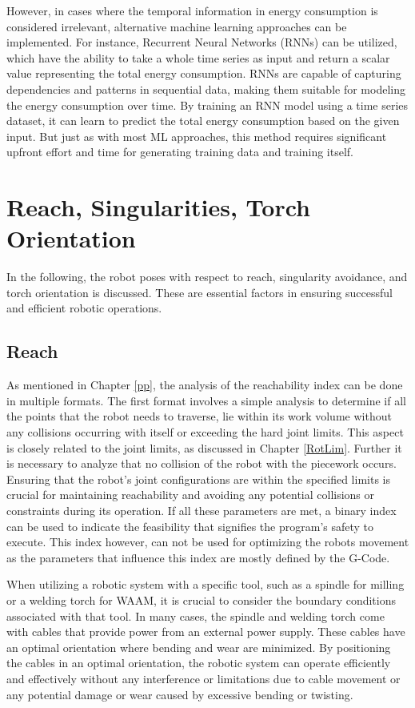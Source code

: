 However, in cases where the temporal information in energy consumption is considered irrelevant, alternative machine learning approaches can be implemented. For instance, Recurrent Neural Networks (RNNs) can be utilized, which have the ability to take a whole time series as input and return a scalar value representing the total energy consumption. RNNs are capable of capturing dependencies and patterns in sequential data, making them suitable for modeling the energy consumption over time. By training an RNN model using a time series dataset, it can learn to predict the total energy consumption based on the given input. But just as with most ML approaches, this method requires significant upfront effort and time for generating training data and training itself.


\section{Reach, Singularities, Torch Orientation}
In the following, the robot poses with respect to reach, singularity avoidance, and torch orientation is discussed. These are essential factors in ensuring successful and efficient robotic operations.
\subsection{Reach} 

As mentioned in Chapter \ref{pp}, the analysis of the reachability index can be done in multiple formats. The first format involves a simple analysis to determine if all the points that the robot needs to traverse, lie within its work volume  without any collisions occurring with itself or exceeding the hard joint limits. This aspect is closely related to the joint limits, as discussed in Chapter \ref{RotLim}. Further it is necessary to analyze that no collision of the robot with the piecework occurs. Ensuring that the robot's joint configurations are within the specified limits is crucial for maintaining reachability and avoiding any potential collisions or constraints during its operation. If all these parameters are met, a binary index can be used to indicate the feasibility that signifies the program's safety to execute. This index however, can not be used for optimizing the robots movement as the parameters that influence this index are mostly defined by the G-Code.

When utilizing a robotic system with a specific tool, such as a spindle for milling or a welding torch for WAAM, it is crucial to consider the boundary conditions associated with that tool. In many cases, the spindle and welding torch come with cables that provide power from an external power supply. These cables have an optimal orientation where bending and wear are minimized. By positioning the cables in an optimal orientation, the robotic system can operate efficiently and effectively without any interference or limitations due to cable movement or any potential damage or wear caused by excessive bending or twisting.

